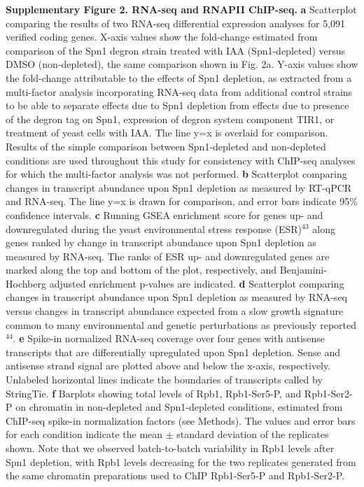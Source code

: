 \documentclass[8pt]{extarticle}
\begin{document}
\vspace{2em}
\textbf{Supplementary Figure 2. RNA-seq and RNAPII ChIP-seq.}
\textbf{a} Scatterplot comparing the results of two RNA-seq differential expression analyses for 5,091 verified coding genes.
X-axis values show the fold-change estimated from comparison of the Spn1 degron strain treated with IAA (Spn1-depleted) versus DMSO (non-depleted), the same comparison shown in Fig. 2a.
Y-axis values show the fold-change attributable to the effects of Spn1 depletion, as extracted from a multi-factor analysis incorporating RNA-seq data from additional control strains to be able to separate effects due to Spn1 depletion from effects due to presence of the degron tag on Spn1, expression of degron system component TIR1, or treatment of yeast cells with IAA.
The line y=x is overlaid for comparison.
Results of the simple comparison between Spn1-depleted and non-depleted conditions are used throughout this study for consistency with ChIP-seq analyses for which the multi-factor analysis was not performed.
\textbf{b} Scatterplot comparing changes in transcript abundance upon Spn1 depletion as measured by RT-qPCR and RNA-seq. The line y=x is drawn for comparison, and error bars indicate 95\% confidence intervals.
\textbf{c} Running GSEA enrichment score for genes up- and downregulated during the yeast environmental stress response (ESR)$^{43}$ along genes ranked by change in transcript abundance upon Spn1 depletion as measured by RNA-seq.
The ranks of ESR up- and downregulated genes are marked along the top and bottom of the plot, respectively, and Benjamini-Hochberg adjusted enrichment p-values are indicated.
\textbf{d} Scatterplot comparing changes in transcript abundance upon Spn1 depletion as measured by RNA-seq versus changes in transcript abundance expected from a slow growth signature common to many environmental and genetic perturbations as previously reported$^{44}$.
\textbf{e} Spike-in normalized RNA-seq coverage over four genes with antisense transcripts that are differentially upregulated upon Spn1 depletion.
Sense and antisense strand signal are plotted above and below the x-axis, respectively.
Unlabeled horizontal lines indicate the boundaries of transcripts called by StringTie.
\textbf{f} Barplots showing total levels of Rpb1, Rpb1-Ser5-P, and Rpb1-Ser2-P on chromatin in non-depleted and Spn1-depleted conditions, estimated from ChIP-seq spike-in normalization factors (see Methods).
The values and error bars for each condition indicate the mean $\pm$ standard deviation of the replicates shown.
Note that we observed batch-to-batch variability in Rpb1 levels after Spn1 depletion, with Rpb1 levels decreasing for the two replicates generated from the same chromatin preparations used to ChIP Rpb1-Ser5-P and Rpb1-Ser2-P.
\end{document}
